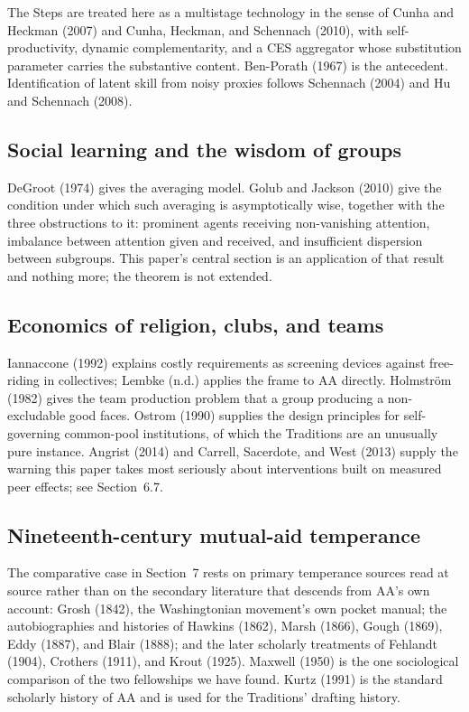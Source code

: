 \documentclass[11pt,a4paper]{article}
\begin{document}
The Steps are treated here as a multistage technology in the sense of Cunha and
Heckman (2007) and Cunha, Heckman, and Schennach (2010), with self-productivity,
dynamic complementarity, and a CES aggregator whose substitution parameter carries
the substantive content. Ben-Porath (1967) is the antecedent. Identification of
latent skill from noisy proxies follows Schennach (2004) and Hu and Schennach
(2008).

\subsection{Social learning and the wisdom of groups}

DeGroot (1974) gives the averaging model. Golub and Jackson (2010) give the
condition under which such averaging is asymptotically wise, together with the
three obstructions to it: prominent agents receiving non-vanishing attention,
imbalance between attention given and received, and insufficient dispersion
between subgroups. This paper's central section is an application of that result
and nothing more; the theorem is not extended.

\subsection{Economics of religion, clubs, and teams}

Iannaccone (1992) explains costly requirements as screening devices against
free-riding in collectives; Lembke (n.d.) applies the frame to AA directly.
Holmstr\"om (1982) gives the team production problem that a group producing a
non-excludable good faces. Ostrom (1990) supplies the design principles for
self-governing common-pool institutions, of which the Traditions are an unusually
pure instance. Angrist (2014) and Carrell, Sacerdote, and West (2013) supply the
warning this paper takes most seriously about interventions built on measured peer
effects; see Section~6.7.

\subsection{Nineteenth-century mutual-aid temperance}

The comparative case in Section~7 rests on primary temperance sources read at
source rather than on the secondary literature that descends from AA's own
account: Grosh (1842), the Washingtonian movement's own pocket manual; the
autobiographies and histories of Hawkins (1862), Marsh (1866), Gough (1869), Eddy
(1887), and Blair (1888); and the later scholarly treatments of Fehlandt (1904),
Crothers (1911), and Krout (1925). Maxwell (1950) is the one sociological
comparison of the two fellowships we have found. Kurtz (1991) is the standard
scholarly history of AA and is used for the Traditions' drafting history.
\end{document}
